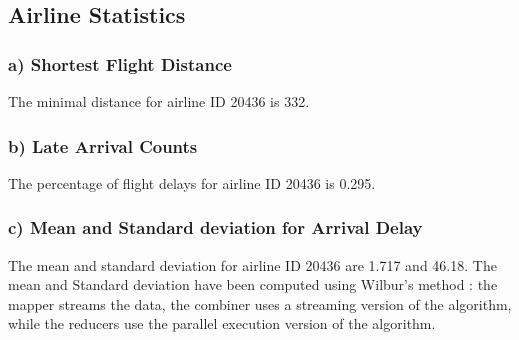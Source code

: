 \subsection{Airline Statistics}

\subsubsection*{a) Shortest Flight Distance}
The minimal distance for airline ID 20436 is 332.






\subsubsection*{b) Late Arrival Counts}
The percentage of flight delays for airline ID 20436 is 0.295.




\subsubsection*{c) Mean and Standard deviation for Arrival Delay}
The mean and standard deviation for airline ID 20436 are 1.717 and 46.18.
The mean and Standard deviation have been computed using Wilbur's method : the mapper streams the data, the combiner uses a streaming version of the algorithm, while the reducers use the parallel execution version of the algorithm.



